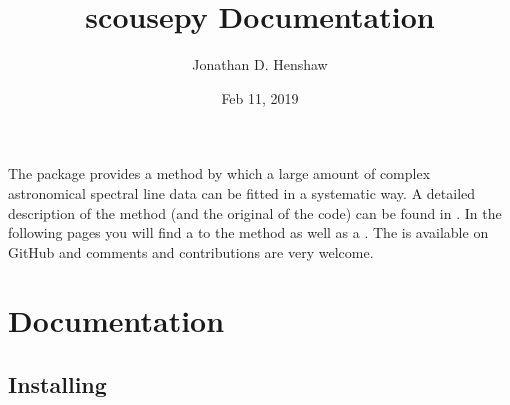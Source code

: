 \documentclass[letterpaper,10pt,english]{sphinxmanual}
\title{scousepy Documentation}
\date{Feb 11, 2019}
\author{Jonathan D. Henshaw}
\let\sphinxpxdimen\pdfpxdimen\else\newdimen\sphinxpxdimen
\begin{document}
\pagestyle{empty}
\sphinxmaketitle
\pagestyle{plain}
\sphinxtableofcontents
\pagestyle{normal}
\label{\detokenize{index::doc}}
\noindent{\hspace*{\fill}\sphinxincludegraphics[width=750\sphinxpxdimen]{{SCOUSE_LOGO}.png}\hspace*{\fill}}

\begin{DUlineblock}{0em}
\item[] 
\end{DUlineblock}



The  package provides a method by which a large amount of complex
astronomical spectral line data can be fitted in a systematic way. A detailed
description of the method (and the original  of the code)
can be found in .
In the following pages you will find a {\hyperref[\detokenize{description:introduction}]{}}
to the method as well as a {\hyperref[\detokenize{tutorial:tutorial}]{}}. The  is available on GitHub and comments
and contributions are very welcome.


\chapter{Documentation}
\label{\detokenize{index:documentation}}

\section{Installing }
\label{\detokenize{installation:installing-scousepy}}\label{\detokenize{installation::doc}}
\end{document}
